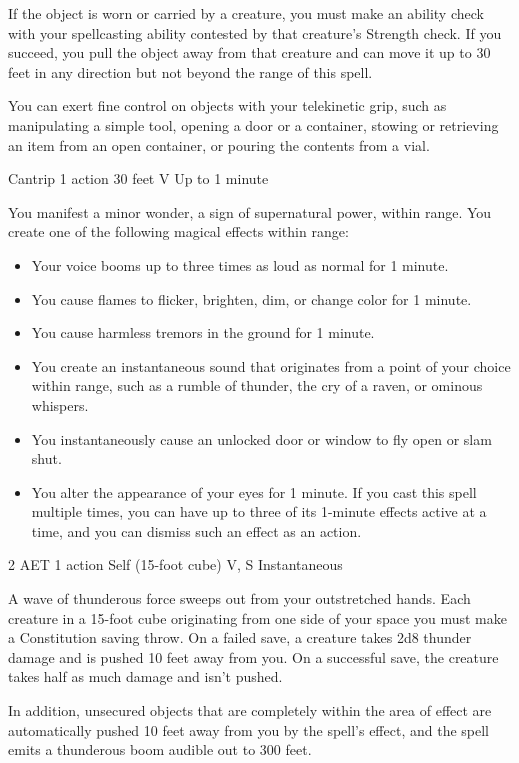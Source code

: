 If the object is worn or carried by a creature, you must make an ability check with your spellcasting ability contested by that creature's Strength check. If you succeed, you pull the object away from that creature and can move it up to 30 feet in any direction but not beyond the range of this spell.

You can exert fine control on objects with your telekinetic grip, such as manipulating a simple tool, opening a door or a container, stowing or retrieving an item from an open container, or pouring the contents from a vial.

\label{spell:thaumaturgy}
{Cantrip}
{1 action}
{30 feet}
{V}
{Up to 1 minute}

You manifest a minor wonder, a sign of supernatural power, within range. You create one of the following magical effects within range:
\begin{itemize}
\item Your voice booms up to three times as loud as normal for 1 minute.
\item You cause flames to flicker, brighten, dim, or change color for 1 minute.
\item You cause harmless tremors in the ground for 1 minute.
\item You create an instantaneous sound that originates from a point of your choice within range, such as a rumble of thunder, the cry of a raven, or ominous whispers.
\item You instantaneously cause an unlocked door or window to fly open or slam shut.
\item You alter the appearance of your eyes for 1 minute. If you cast this spell multiple times, you can have up to three of its 1-minute effects active at a time, and you can dismiss such an effect as an action.
\end{itemize}

\label{spell:thunderwave}
{2 AET}
{1 action}
{Self (15-foot cube)}
{V, S}
{Instantaneous}

A wave of thunderous force sweeps out from your outstretched hands. Each creature in a 15-foot cube originating from one side of your space you must make a Constitution saving throw. On a failed save, a creature takes 2d8 thunder damage and is pushed 10 feet away from you. On a successful save, the creature takes half as much damage and isn't pushed.

In addition, unsecured objects that are completely within the area of effect are automatically pushed 10 feet away from you by the spell's effect, and the spell emits a thunderous boom audible out to 300 feet.

